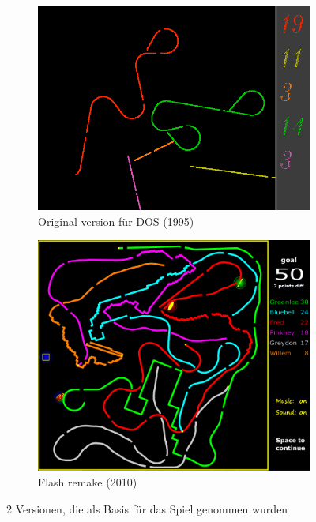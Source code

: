 \documentclass[doktyp=studarbeit]{TUBAFarbeiten}
\begin{document}
\begin{figure}[!htb]
    \centering
    \begin{subfigure}[b]{0.45\textwidth}
		\centering
        \includegraphics[width=1\linewidth]{dos-version.png}
		\caption{Original version für DOS (1995)}
	\end{subfigure}
	\qquad
	\begin{subfigure}[b]{0.45\textwidth}
		\centering
        \includegraphics[width=1\linewidth]{flash-version.png}
        \caption{Flash remake (2010)}
	\end{subfigure}
    \caption{2 Versionen, die als Basis für das Spiel genommen wurden}
	\label{fig:dos-version}
\end{figure}
\end{document}
